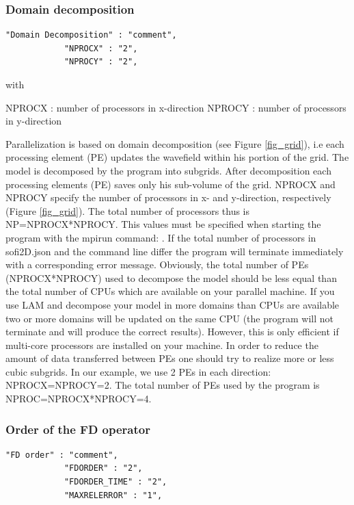 \documentclass[11pt,onecolumn,oneside]{article}
\begin{document}
\subsubsection{Domain decomposition}

\begin{verbatim}
"Domain Decomposition" : "comment",
			"NPROCX" : "2",
			"NPROCY" : "2",
\end{verbatim}

with

NPROCX : number of processors in x-direction \newline
NPROCY : number of processors in y-direction

Parallelization is based on domain decomposition (see Figure \ref{fig_grid}), i.e each processing element (PE) updates the wavefield within his portion of the grid. The model is  decomposed by the program into subgrids. After decomposition each processing elements (PE) saves only his sub-volume of the grid. NPROCX and NPROCY specify the number of processors in x- and y-direction, respectively (Figure  \ref{fig_grid}). The total number of processors thus is NP=NPROCX*NPROCY. This values must be specified when starting the program with the mpirun command: . If the total number of processors in sofi2D.json and the command line differ the program will terminate immediately with a corresponding error message. Obviously, the total number of PEs (NPROCX*NPROCY) used to decompose the model should be less equal than the total number of CPUs which are available on your parallel machine. If you use LAM and decompose your model in more
domains than CPUs are available two or more  domains will be updated on the same CPU (the program will not terminate and will produce the correct results). However, this is only efficient if multi-core processors are installed on your machine. In order to reduce the amount of data transferred between PEs one should try to realize more or less cubic subgrids. In our example, we use 2 PEs in each direction: NPROCX=NPROCY=2. The total number of PEs used by the program is NPROC=NPROCX*NPROCY=4. 

\subsubsection{Order of the FD operator}

\begin{verbatim}
"FD order" : "comment",
			"FDORDER" : "2",
			"FDORDER_TIME" : "2",
			"MAXRELERROR" : "1",
\end{verbatim}
\end{document}
